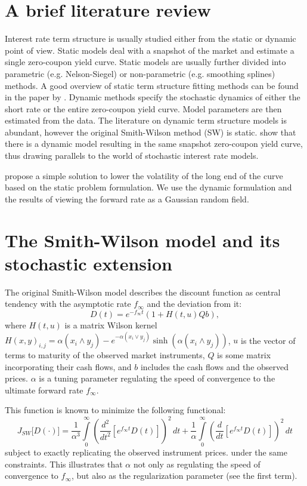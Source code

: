 \documentclass[a4paper]{iccf2017}
\begin{document}
\section{A brief literature review}
Interest rate term structure is usually studied either from the static or dynamic point of view. Static models deal with a snapshot of the market and estimate a single zero-coupon yield curve. Static models are usually further divided into parametric (e.g. Nelson-Siegel) or non-parametric (e.g. smoothing splines) methods. A good overview of static term structure fitting methods can be found in the paper by \cite{chapman2001recent}. Dynamic methods specify the stochastic dynamics of either the short rate or the entire zero-coupon yield curve. Model parameters are then estimated from the data. The literature on dynamic term structure models is abundant, however the original Smith-Wilson method (SW) is static. \cite{Lager,Andersson_Lindholm} show that there is a dynamic model resulting in the same snapshot zero-coupon yield curve, thus drawing parallels to the world of stochastic interest rate models.

\cite{kocken2012dangerous} propose a simple solution to lower the volatility of the long end of the curve based on the static problem formulation. We use the dynamic formulation and the results of \cite{kennedy1994term,goldstein2000term} viewing the forward rate as a Gaussian random field.

\section{The Smith-Wilson model and its stochastic extension}
The original Smith-Wilson model describes the discount function as central tendency with the asymptotic rate $f_{\infty}$ and the deviation from it:
$$
D(t)=e^{-f_{\infty}t}(1+H(t,u)Qb),
$$
where $H(t,u)$ is a matrix Wilson kernel $H(x,y)_{i,j}=\alpha(x_i\wedge y_j) - e^{-\alpha(x_i\vee y_j)}\sinh(\alpha(x_i\wedge y_j))$, $u$ is the vector of terms to maturity of the observed market instruments, $Q$ is some matrix incorporating their cash flows, and $b$ includes the cash flows and the observed prices. $\alpha$ is a tuning parameter regulating the speed of convergence to the ultimate forward rate $f_{\infty}$.

This function is known to minimize the following functional:
$$
J_{SW}\big[D(\cdot)\big] = 
\frac{1}{\alpha^3}
\int\limits_0^\infty 
\left(
\frac{d^2}{dt^2}
\left[
e^{f_\infty t} D(t)
\right]
\right)^2
\, dt
+
\frac{1}{\alpha}
\int\limits_0^\infty 
\left(
\frac{d}{dt}
\left[
e^{f_\infty t} D(t)
\right]
\right)^2
\, dt 
$$
subject to exactly replicating the observed instrument prices. %
under the same constraints. This illustrates that $\alpha$ not only as regulating the speed of convergence to $f_\infty$, but also as the regularization parameter (see the first term).
\end{document}
